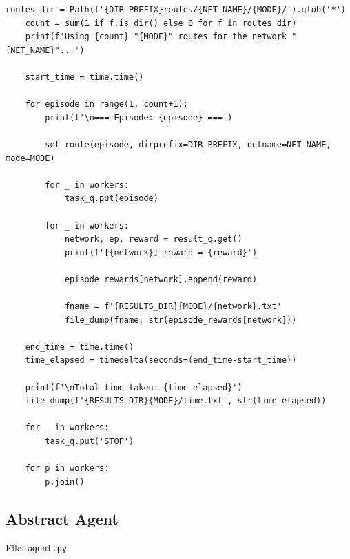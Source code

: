 \documentclass[a4paper]{report}
\begin{document}
\begin{lstlisting}[style=pythonstyle]
    routes_dir = Path(f'{DIR_PREFIX}routes/{NET_NAME}/{MODE}/').glob('*')
    count = sum(1 if f.is_dir() else 0 for f in routes_dir)
    print(f'Using {count} "{MODE}" routes for the network "{NET_NAME}"...')

    start_time = time.time()

    for episode in range(1, count+1):
        print(f'\n=== Episode: {episode} ===')
        
        set_route(episode, dirprefix=DIR_PREFIX, netname=NET_NAME, mode=MODE)

        for _ in workers:
            task_q.put(episode)

        for _ in workers:
            network, ep, reward = result_q.get()
            print(f'[{network}] reward = {reward}')

            episode_rewards[network].append(reward)

            fname = f'{RESULTS_DIR}{MODE}/{network}.txt'
            file_dump(fname, str(episode_rewards[network]))

    end_time = time.time()
    time_elapsed = timedelta(seconds=(end_time-start_time))

    print(f'\nTotal time taken: {time_elapsed}')
    file_dump(f'{RESULTS_DIR}{MODE}/time.txt', str(time_elapsed))

    for _ in workers:
        task_q.put('STOP')

    for p in workers:
        p.join()
\end{lstlisting}

\subsection{Abstract Agent}

File: \texttt{agent.py}
\end{document}
